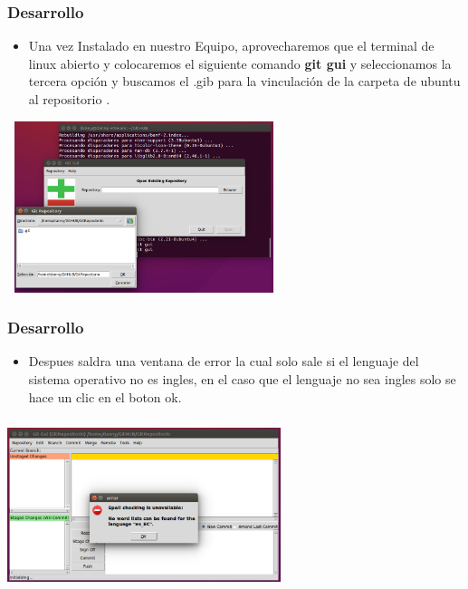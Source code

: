 \documentclass[8pt]{beamer}
\begin{document}
\begin{frame}
\frametitle{Desarrollo}

\setlength{\parskip}{03pt}
\begin{center}
\begin{itemize}
\justifying
\item{Una vez Instalado en nuestro Equipo, aprovecharemos que el terminal de linux abierto y colocaremos el siguiente comando \textbf{git gui} y seleccionamos la tercera opción y buscamos el .gib para la vinculación de la carpeta de ubuntu al repositorio .}\end{itemize} 

\setlength{\parskip}{08pt}
\includegraphics[width=8cm, height=5cm]{img/doce}
\end{center}
\end{frame}



\begin{frame}
\frametitle{Desarrollo}

\setlength{\parskip}{03pt}
\begin{center}
\begin{itemize}
\justifying
\item{ Despues saldra una ventana de error la cual solo sale si el lenguaje del sistema operativo no es ingles, en el caso que el lenguaje no sea ingles solo se hace un clic en el boton ok.}\end{itemize} 

\setlength{\parskip}{08pt}
\includegraphics[width=8cm, height=5cm]{img/trece}
\end{center}
\end{frame}
\end{document}
